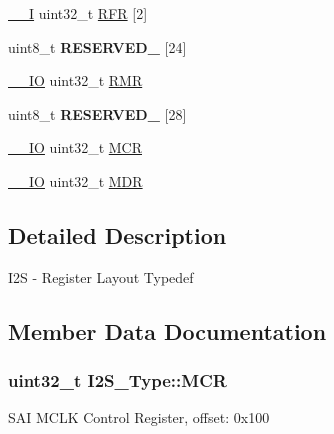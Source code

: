 \begin{DoxyCompactItemize}
\item 
\hyperlink{core__sc300_8h_af63697ed9952cc71e1225efe205f6cd3}{\+\_\+\+\_\+I} uint32\+\_\+t \hyperlink{structI2S__Type_a16852a97d90329db35b5ff8663c9488c}{R\+FR} \mbox{[}2\mbox{]}
\item 
uint8\+\_\+t {\bfseries R\+E\+S\+E\+R\+V\+E\+D\+\_} \mbox{[}24\mbox{]}\hypertarget{structI2S__Type_ad1e6349f919b1aeab63f6421cf2049ee}{}\label{structI2S__Type_ad1e6349f919b1aeab63f6421cf2049ee}

\item 
\hyperlink{core__sc300_8h_aec43007d9998a0a0e01faede4133d6be}{\+\_\+\+\_\+\+IO} uint32\+\_\+t \hyperlink{structI2S__Type_ab2b55d0a250082bacc98cb3845769560}{R\+MR}
\item 
uint8\+\_\+t {\bfseries R\+E\+S\+E\+R\+V\+E\+D\+\_} \mbox{[}28\mbox{]}\hypertarget{structI2S__Type_ae7d605692953d3b1f66415a203e171a8}{}\label{structI2S__Type_ae7d605692953d3b1f66415a203e171a8}

\item 
\hyperlink{core__sc300_8h_aec43007d9998a0a0e01faede4133d6be}{\+\_\+\+\_\+\+IO} uint32\+\_\+t \hyperlink{structI2S__Type_a1120f8317764b1cd8d7b624175c13a15}{M\+CR}
\item 
\hyperlink{core__sc300_8h_aec43007d9998a0a0e01faede4133d6be}{\+\_\+\+\_\+\+IO} uint32\+\_\+t \hyperlink{structI2S__Type_aec34525af6f820dc003963ede5542ef1}{M\+DR}
\end{DoxyCompactItemize}


\subsection{Detailed Description}
I2S -\/ Register Layout Typedef 

\subsection{Member Data Documentation}
\subsubsection[{\texorpdfstring{M\+CR}{MCR}}]{ uint32\+\_\+t I2\+S\+\_\+\+Type\+::\+M\+CR}\hypertarget{structI2S__Type_a1120f8317764b1cd8d7b624175c13a15}{}\label{structI2S__Type_a1120f8317764b1cd8d7b624175c13a15}
S\+AI M\+C\+LK Control Register, offset\+: 0x100 

